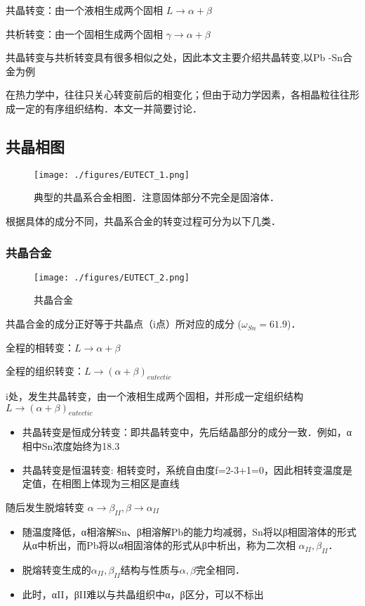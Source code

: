 共晶转变：由一个液相生成两个固相 $L \rightarrow \alpha+\beta$

共析转变：由一个固相生成两个固相 $\gamma \rightarrow \alpha+\beta$

共晶转变与共析转变具有很多相似之处，因此本文主要介绍共晶转变,以Pb
-Sn合金为例

在热力学中，往往只关心转变前后的相变化；但由于动力学因素，各相晶粒往往形成一定的有序组织结构．本文一并简要讨论．

\subsection{共晶相图}
\begin{figure}[ht]
\centering
\texttt{[image: ./figures/EUTECT\_1.png]}
\caption{典型的共晶系合金相图．注意固体部分不完全是固溶体．} \label{EUTECT_fig1}
\end{figure}
根据具体的成分不同，共晶系合金的转变过程可分为以下几类．

\subsubsection{共晶合金}
\begin{figure}[ht]
\centering
\texttt{[image: ./figures/EUTECT\_2.png]}
\caption{共晶合金} \label{EUTECT_fig2}
\end{figure}

共晶合金的成分正好等于共晶点（i点）所对应的成分 ($\omega_{Sn}=61.9$)．

全程的相转变：$L \rightarrow \alpha+\beta$

全程的组织转变：$L \rightarrow (\alpha+\beta)_{eutectic}$

i处，发生共晶转变，由一个液相生成两个固相，并形成一定组织结构 $L \rightarrow (\alpha+\beta)_{eutectic}$
\begin{itemize}
\item 共晶转变是恒成分转变：即共晶转变中，先后结晶部分的成分一致．例如，α相中Sn浓度始终为18.3%
\item 共晶转变是恒温转变: 相转变时，系统自由度f=2-3+1=0，因此相转变温度是定值，在相图上体现为三相区是直线
\end{itemize}

随后发生脱熔转变 $\alpha \rightarrow \beta_{II}, \beta \rightarrow \alpha_{II}$
\begin{itemize}
\item 随温度降低，α相溶解Sn、β相溶解Pb的能力均减弱，Sn将以β相固溶体的形式从α中析出，而Pb将以α相固溶体的形式从β中析出，称为二次相 $\alpha_{II},\beta_{II} $．
\item 脱熔转变生成的$\alpha_{II},\beta_{II} $结构与性质与$\alpha, \beta$完全相同．
\item 此时，αII，βII难以与共晶组织中α，β区分，可以不标出
\end{itemize}

